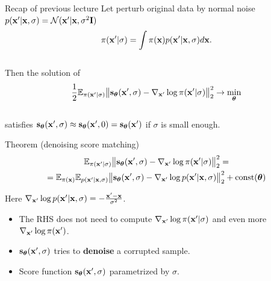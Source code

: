 \begin{frame}{Recap of previous lecture}
	Let perturb original data by normal noise $p(\mathbf{x}' | \mathbf{x}, \sigma) = \mathcal{N}(\mathbf{x}' | \mathbf{x}, \sigma^2 \mathbf{I})$
	\vspace{-0.3cm}
	\[
	\pi(\mathbf{x}' | \sigma) = \int \pi(\mathbf{x}) p(\mathbf{x}' | \mathbf{x}, \sigma) d\mathbf{x}.
	\]
	\vspace{-0.6cm} \\
	Then the solution of 
	\vspace{-0.2cm}
	\[
	\frac{1}{2} \mathbb{E}_{\pi(\mathbf{x}' | \sigma)}\bigl\| \mathbf{s}_{\boldsymbol{\theta}}(\mathbf{x}', \sigma) - \nabla_{\mathbf{x}'} \log \pi(\mathbf{x}' | \sigma) \bigr\|^2_2 \rightarrow \min_{\boldsymbol{\theta}}
	\]
	\vspace{-0.5cm} \\
	satisfies $\mathbf{s}_{\boldsymbol{\theta}}(\mathbf{x}', \sigma) \approx \mathbf{s}_{\boldsymbol{\theta}}(\mathbf{x}', 0) = \mathbf{s}_{\boldsymbol{\theta}}(\mathbf{x}')$ if $\sigma$ is small enough.
	\begin{block}{Theorem (denoising score matching)}
		\vspace{-0.8cm}
		\begin{multline*}
			\mathbb{E}_{\pi(\mathbf{x}' | \sigma)}\bigl\| \mathbf{s}_{\boldsymbol{\theta}}(\mathbf{x}', \sigma) - \nabla_{\mathbf{x}'} \log \pi(\mathbf{x}' | \sigma) \bigr\|^2_2 = \\ = \mathbb{E}_{\pi(\mathbf{x})} \mathbb{E}_{p(\mathbf{x}' | \mathbf{x}, \sigma)}\bigl\| \mathbf{s}_{\boldsymbol{\theta}}(\mathbf{x}', \sigma) - \nabla_{\mathbf{x}'} \log p(\mathbf{x}' | \mathbf{x}, \sigma) \bigr\|^2_2 + \text{const}(\boldsymbol{\theta})
		\end{multline*}
		\vspace{-0.8cm}
	\end{block}
	Here $\nabla_{\mathbf{x}'} \log p(\mathbf{x}' | \mathbf{x}, \sigma) = - \frac{\mathbf{x}' - \mathbf{x}}{\sigma^2}$.
	\begin{itemize}
		\item The RHS does not need to compute $\nabla_{\mathbf{x}'} \log \pi(\mathbf{x}' | \sigma)$ and even more $\nabla_{\mathbf{x}'} \log \pi(\mathbf{x}')$.
		\item $\mathbf{s}_{\boldsymbol{\theta}}(\mathbf{x}', \sigma)$ tries to \textbf{denoise} a corrupted sample.
		\item Score function $\mathbf{s}_{\boldsymbol{\theta}}(\mathbf{x}', \sigma)$ parametrized by $\sigma$. 
	\end{itemize}
\end{frame}
